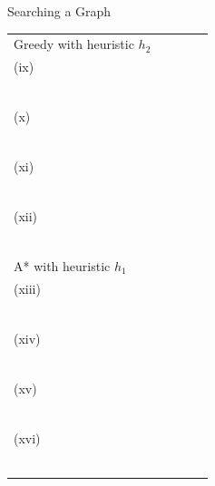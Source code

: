 \begin{problem}{Searching a Graph}
\begin{question}[15]
\begin{table}[h]
\begin{center}
\begin{tabular}{|l|l|l|l|l|}
\hline
Greedy with heuristic $h_2$ & \begin{minipage}{2cm}~\\(ix)\quad\solution{}{\Threeaix}~\\~\\\end{minipage} &
\begin{minipage}{2cm}~\\(x)\quad\solution{}{\Threeax}~\\~\\\end{minipage} & 
\begin{minipage}{2cm}~\\(xi)\quad\solution{}{\Threeaxi}~\\~\\\end{minipage} &
\begin{minipage}{3cm}~\\(xii)\quad\solution{}{\Threeaxii}~\\~\\\end{minipage}\\

\hline
A* with heuristic $h_1$ & \begin{minipage}{2cm}~\\(xiii)\quad\solution{}{\Threeaxiii}~\\~\\\end{minipage} &
\begin{minipage}{2cm}~\\(xiv)\quad\solution{}{\Threeaxiv}~\\~\\\end{minipage} & 
\begin{minipage}{2cm}~\\(xv)\quad\solution{}{\Threeaxv}~\\~\\\end{minipage} &
\begin{minipage}{3cm}~\\(xvi)\quad\solution{}{\Threeaxvi}~\\~\\\end{minipage}\\


\end{tabular}
\end{center}
\end{table}
\end{question}
\end{problem}
